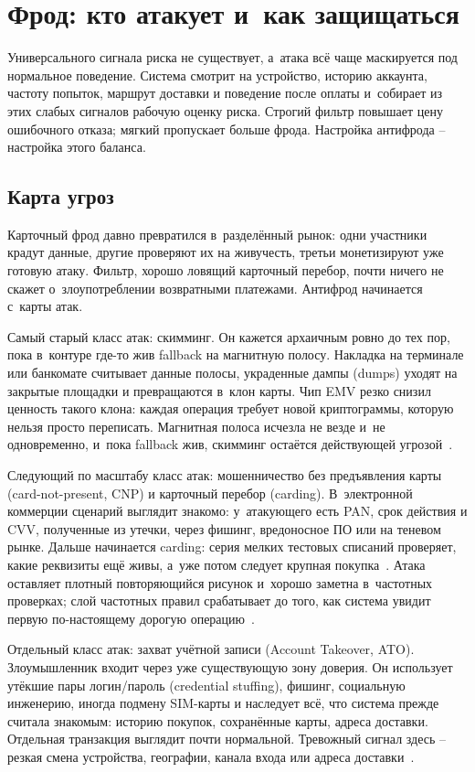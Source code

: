 
\chapter{Фрод: кто атакует и~как защищаться}\label{ch:fraud}
Универсального сигнала риска не существует, а~атака всё чаще
маскируется под нормальное поведение. Система смотрит на устройство,
историю аккаунта, частоту попыток, маршрут доставки и поведение после
оплаты и~собирает из этих слабых сигналов рабочую оценку риска.
Строгий фильтр повышает цену ошибочного отказа; мягкий пропускает
больше фрода. Настройка антифрода -- настройка этого баланса.

\section{Карта угроз}\label{sec:fraud-threats}

Карточный фрод давно превратился в~разделённый рынок: одни
участники крадут данные, другие проверяют их на живучесть, третьи
монетизируют уже готовую атаку. Фильтр, хорошо ловящий карточный
перебор, почти ничего не скажет о~злоупотреблении возвратными платежами.
Антифрод начинается с~карты атак.

Самый старый класс атак: скимминг. Он кажется архаичным ровно до тех
пор, пока в~контуре где-то жив fallback на магнитную полосу. Накладка
на терминале или банкомате считывает данные полосы, украденные дампы
(dumps) уходят на закрытые площадки и превращаются в~клон карты. Чип
EMV резко снизил ценность такого клона: каждая операция требует новой
криптограммы, которую нельзя просто переписать. Магнитная полоса
исчезла не везде и~не одновременно, и~пока fallback жив, скимминг
остаётся действующей угрозой~\cite{emvco-book1}.

Следующий по масштабу класс атак: мошенничество без предъявления
карты (card-not-present, CNP) и карточный перебор (carding).
В~электронной коммерции сценарий выглядит знакомо: у~атакующего есть
PAN, срок действия и CVV, полученные из утечки, через фишинг,
вредоносное ПО или на теневом рынке. Дальше начинается carding:
серия мелких тестовых списаний проверяет, какие реквизиты ещё живы,
а~уже потом следует крупная покупка~\cite{mc-fraudulent-merchants-2025}.
Атака оставляет плотный повторяющийся рисунок и~хорошо заметна
в~частотных проверках; слой частотных правил срабатывает до того,
как система увидит первую по-настоящему дорогую
операцию~\cite{visa-auth-management-2020}.

Отдельный класс атак: захват учётной записи (Account Takeover, ATO).
Злоумышленник входит через уже существующую зону доверия. Он
использует утёкшие пары логин/пароль (credential stuffing), фишинг,
социальную инженерию, иногда подмену SIM-карты и наследует всё,
что система прежде считала знакомым: историю покупок, сохранённые
карты, адреса доставки. Отдельная транзакция выглядит почти
нормальной. Тревожный сигнал здесь -- резкая смена устройства,
географии, канала входа или адреса
доставки~\cite{mc-fraudulent-merchants-2025}.

